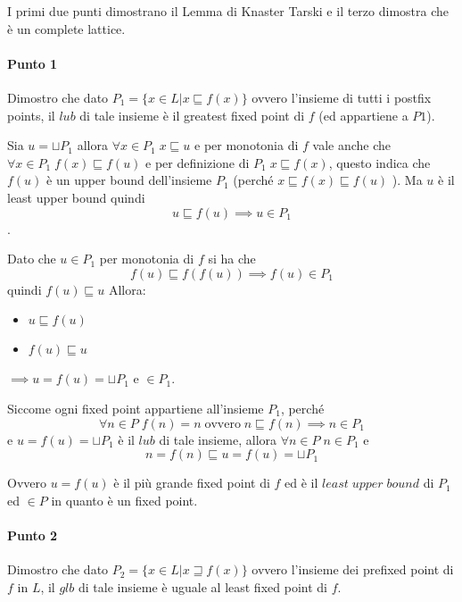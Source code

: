 \documentclass{article}
\newcommand{\pd}{P_{2}}
\begin{document}
I primi due punti dimostrano il Lemma di Knaster Tarski e il terzo dimostra che è un complete lattice.

\paragraph{Punto 1}

Dimostro che dato $P_{1}=\{x \in L | x  \sqsubseteq f(x)\}$ ovvero l'insieme di tutti i postfix points, il $lub$ di tale insieme è il greatest fixed point di $f$ (ed appartiene a $P1$).


Sia $u=\sqcup P_{1}$ allora $\forall x \in P_{1} \; x \sqsubseteq u$ e per monotonia di $f$ vale anche che $\forall x \in P_{1} \; f(x)\sqsubseteq f(u)$ e per definizione di $P_{1}\; x \sqsubseteq f(x)$, questo indica che $f(u)$ è un upper bound dell'insieme $P_{1}$ (perché $x \sqsubseteq f(x) \sqsubseteq f(u)$ ). Ma $u$ è il least upper bound quindi $$u \sqsubseteq f(u) \implies u \in P_{1}$$.

Dato che $u \in P_{1}$ per monotonia di $f$ si ha che $$f(u)\sqsubseteq f(f(u)) \implies f(u) \in P_{1}$$
 quindi $f(u)\sqsubseteq u$ Allora:
\begin{itemize}
    \item $u\sqsubseteq f(u)$
    \item $f(u)\sqsubseteq u$
\end{itemize}
$\implies u=f(u)=\sqcup P_{1}$ e $\in P_{1}$.

Siccome ogni fixed point appartiene all'insieme $P_{1}$, perché $$\forall n \in P \; f(n)=n  \;\text{ovvero} \; n \sqsubseteq f(n) \implies n \in P_{1}$$ e $u=f(u)=\sqcup P_{1}$ è il $lub$ di tale insieme, allora $\forall n \in P \; n \in P_{1} $ e $$n = f(n) \sqsubseteq u = f(u) =\sqcup P_{1}$$

Ovvero $u=f(u)$  è il più grande fixed point di $f$ ed è il $least\; upper\; bound$ di $P_{1}$ ed $\in P$ in quanto è un fixed point. 

\paragraph{Punto 2} Dimostro che dato $\pd = \{x \in L | x \sqsupseteq f(x) \}$ ovvero l'insieme dei prefixed point di $f$ in $L$, il $glb$ di tale insieme è uguale al least fixed point di $f$.
\end{document}

